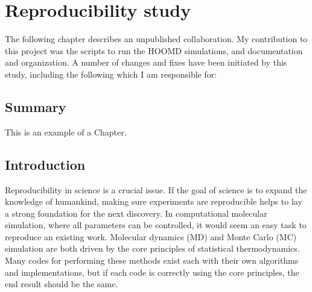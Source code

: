 \chapter{Reproducibility study}
\label{chap:reproducibility}

The following chapter describes an unpublished collaboration.
My contribution to this project was the scripts to run the HOOMD simulations, and documentation and organization. 
A number of changes and fixes have been initiated by this study, including the following which I am responsible for:

\section{Summary}
 
This is an example of a Chapter. 

\section{Introduction}
Reproducibility in science is a crucial issue.
If the goal of science is to expand the knowledge of humankind, making sure experiments are reproducible helps to lay a strong foundation for the next discovery.
In computational molecular simulation, where all parameters can be controlled, it would seem an easy task to reproduce an existing work.
Molecular dynamics (MD) and Monte Carlo (MC) simulation are both driven by the core principles of statistical thermodynamics.
Many codes for performing these methods exist each with their own algorithms and implementations, but if each code is correctly using the core principles, the end result should be the same.

